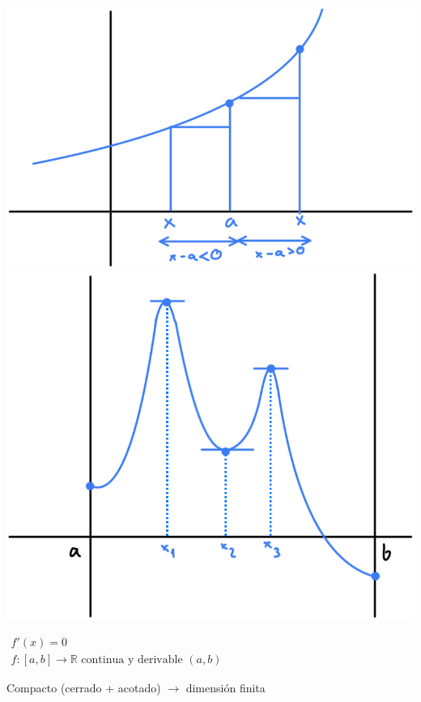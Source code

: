 \documentclass[12pt]{article}
\begin{document}
\begin{center}
	\includegraphics{"imagenes/Gráfica 27-10"}
	\qquad
	\includegraphics{"imagenes/Gráfica2 27-10"}
\end{center}


$\begin{array}{l}
	f'(x)=0\\
	f:[a,b]\longrightarrow\mathbb{R}\text{ continua y derivable }(a,b)
\end{array}$

Compacto (cerrado + acotado) $\longrightarrow$ dimensión finita
\end{document}

